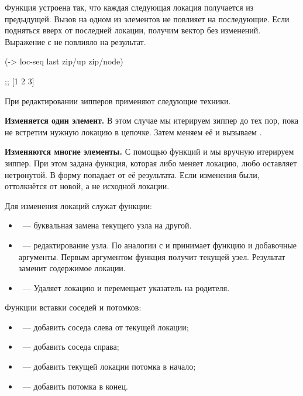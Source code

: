 Функция  устроена так, что каждая следующая локация получается из
предыдущей. Вызов  на одном из элементов не повлияет на
последующие. Если подняться вверх от последней локации, получим вектор без
изменений. Выражение с  не повлияло на результат.

\begin{english}
  \begin{clojure}
(-> loc-seq last zip/up zip/node)

;; [1 2 3]
  \end{clojure}
\end{english}

При редактировании зипперов применяют следующие техники.

\textbf{Изменяется один элемент.} В этом случае мы итерируем зиппер до тех пор, пока
не встретим нужную локацию в цепочке. Затем меняем её и вызываем .

\textbf{Изменяются многие элементы.} С помощью функций  и
 мы вручную итерируем зиппер. При этом задана функция, которая
либо меняет локацию, любо оставляет нетронутой. В форму  попадает
 от её результата. Если изменения были, 
оттолкнётся от новой, а не исходной локации.

\pagebreaklarge


Для изменения локаций служат функции:

\begin{itemize}

\item
  ~--- буквальная замена текущего узла на другой.

\item
  ~--- редактирование узла. По аналогии с  и  принимает
  функцию и добавочные аргументы. Первым аргументом функция получит текущей
  узел. Результат заменит содержимое локации.

\item
  ~--- Удаляет локацию и перемещает указатель на родителя.

\end{itemize}


Функции вставки соседей и потомков:

\begin{itemize}

\item
  ~--- добавить соседа слева от текущей локации;

\item
  ~--- добавить соседа справа;

\item
  ~--- добавить текущей локации потомка в начало;

\item
  ~--- добавить потомка в конец.

\end{itemize}

